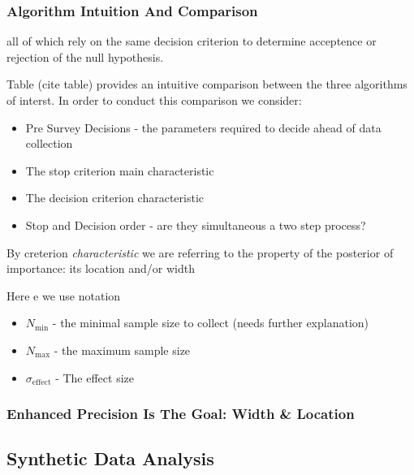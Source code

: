 \subsubsection{Algorithm Intuition And Comparison}
all of which rely on the same decision criterion to determine acceptence
or rejection of the null hypothesis.


Table (cite table) provides an intuitive comparison between the three algorithms of interst.
In order to conduct this comparison we consider:
\begin{itemize}
    \item Pre Survey Decisions - the parameters required to decide ahead of data
    collection
    \item The stop criterion main characteristic 
    \item The decision criterion characteristic
    \item Stop and Decision order - are they simultaneous a two step process?
\end{itemize}
By creterion {\it characteristic} we are referring to the property of the posterior of
importance: its location and/or width



   
Here e we use notation

  \begin{itemize}
        \item $N_\mathrm{min}$ - the minimal sample size to collect (needs further explanation)
        \item $N_\mathrm{max}$ - the maximum sample size
        \item $\sigma_\mathrm{effect}$ - The effect size
         
  \end{itemize}


\subsubsection{Enhanced Precision Is The Goal: Width \& Location}

\subsection{Synthetic Data Analysis}